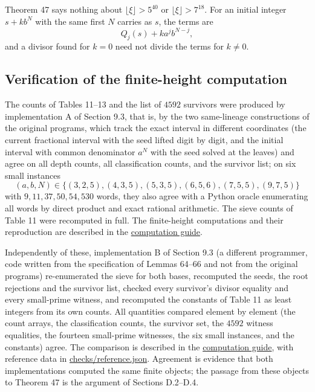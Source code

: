 \documentclass[11pt,reqno]{amsart}
\theoremstyle{definition}
\theoremstyle{remark}
\begin{document}
Theorem 47 says nothing about \(\lfloor\xi\rfloor>5^{40}\) or
\(\lfloor\xi\rfloor>7^{18}\). For an initial integer \(s+kb^N\) with the
same first \(N\) carries as \(s\), the terms are
\[
Q_j(s)+ka^jb^{N-j},
\]
and a divisor found for \(k=0\) need not divide
the terms for \(k\ne0\).

\subsection{Verification of the finite-height computation}\label{sec:D.5}

The counts of Tables 11--13 and the list of \(4592\) survivors were
produced by implementation A of Section 9.3, that is, by the two
same-lineage constructions of the original programs, which track
the exact interval in different coordinates (the current fractional
interval with the seed lifted digit by digit, and the initial interval
with common denominator \(a^N\) with the seed solved at the leaves) and
agree on all depth counts, all classification counts, and the survivor
list; on six small instances
\[
(a,b,N)\in\{(3,2,5),(4,3,5),(5,3,5),
(6,5,6),(7,5,5),(9,7,5)\}
\]
with \(9,11,37,50,54,530\) words, they also
agree with a Python oracle enumerating all words by direct product and
exact rational arithmetic. The sieve counts of Table 11 were recomputed
in full. The finite-height computations and their reproduction are described in
the \href{supplement/COMPUTATION.md}{computation guide}.

Independently of these, implementation B of Section 9.3 (a different
programmer, code written from the specification of Lemmas 64--66 and not
from the original programs) re-enumerated the sieve for both bases,
recomputed the seeds, the root rejections and the survivor list, checked
every survivor's divisor equality and every small-prime witness, and
recomputed the constants of Table 11 as least integers from its own
counts. All quantities compared element by element (the count arrays,
the classification counts, the survivor set, the \(4592\) witness
equalities, the fourteen small-prime witnesses, the six small
instances, and the constants) agree. The comparison is described in
the \href{supplement/COMPUTATION.md}{computation guide}, with reference data in \href{checks/reference.json}{checks/reference.json}.
Agreement is evidence that both implementations computed the same finite
objects; the passage from these objects to Theorem 47 is the argument of
Sections D.2--D.4.
\end{document}
